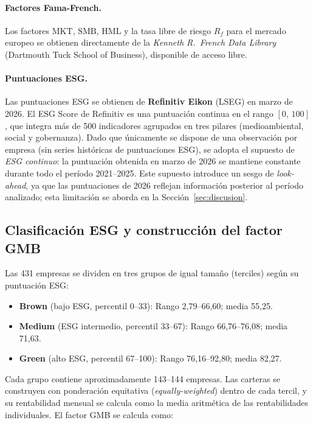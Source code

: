 \documentclass[12pt, a4paper]{article}
\begin{document}
\paragraph{Factores Fama-French.} Los factores $\mathrm{MKT}$, $\mathrm{SMB}$,
$\mathrm{HML}$ y la tasa libre de riesgo $R_f$ para el mercado europeo se obtienen
directamente de la \textit{Kenneth R.\ French Data Library} (Dartmouth Tuck School
of Business), disponible de acceso libre.

\paragraph{Puntuaciones ESG.} Las puntuaciones ESG se obtienen de \textbf{Refinitiv
Eikon} (LSEG) en marzo de 2026. El ESG Score de Refinitiv es una puntuaci\'on continua
en el rango $[0,\,100]$, que integra m\'as de 500 indicadores agrupados en tres pilares
(medioambiental, social y gobernanza). Dado que \'unicamente se dispone de una
observaci\'on por empresa (sin series hist\'oricas de puntuaciones ESG), se adopta el
supuesto de \textit{ESG continuo}: la puntuaci\'on obtenida en marzo de 2026 se
mantiene constante durante todo el per\'iodo 2021--2025. Este supuesto introduce un
sesgo de \textit{look-ahead}, ya que las puntuaciones de 2026 reflejan informaci\'on
posterior al per\'iodo analizado; esta limitaci\'on se aborda en la
Secci\'on~\ref{sec:discusion}.

\subsection{Clasificaci\'on ESG y construcci\'on del factor GMB}
\label{subsec:gmb}

Las 431 empresas se dividen en tres grupos de igual tama\~no (terciles) seg\'un su
puntuaci\'on ESG:

\begin{itemize}
  \item \textbf{Brown} (bajo ESG, percentil 0--33): Rango 2,79--66,60; media 55,25.
  \item \textbf{Medium} (ESG intermedio, percentil 33--67): Rango 66,76--76,08; media 71,63.
  \item \textbf{Green} (alto ESG, percentil 67--100): Rango 76,16--92,80; media 82,27.
\end{itemize}

Cada grupo contiene aproximadamente 143--144 empresas. Las carteras se construyen con
ponderaci\'on equitativa (\textit{equally-weighted}) dentro de cada tercil, y su
rentabilidad mensual se calcula como la media aritm\'etica de las rentabilidades
individuales. El factor GMB se calcula como:
\end{document}
